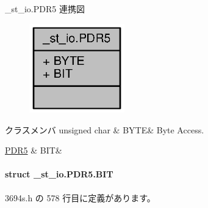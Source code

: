 \+\_\+st\+\_\+io.\+P\+D\+R5 連携図
\nopagebreak
\begin{figure}[H]
\begin{center}
\leavevmode
\includegraphics[width=117pt]{d0/d8b/union__st__io_8PDR5__coll__graph}
\end{center}
\end{figure}
\begin{DoxyFields}{クラスメンバ}
unsigned char\label{3694s_8h_ae409eb2ba6eb6801f52763ae370c350e}
&
B\+Y\+T\+E&
Byte Access. \\
\hline

\hyperlink{3694s_8h_d0/da1/struct__st__io_8PDR5_8BIT}{P\+D\+R5}\label{3694s_8h_adb957fdc8000e1eef04a243f5199aa52}
&
B\+I\+T&
\\
\hline

\end{DoxyFields}
\label{struct__st__io_8PDR5_8BIT}
\paragraph{struct \+\_\+st\+\_\+io.\+P\+D\+R5.\+B\+I\+T}


 3694s.\+h の 578 行目に定義があります。



